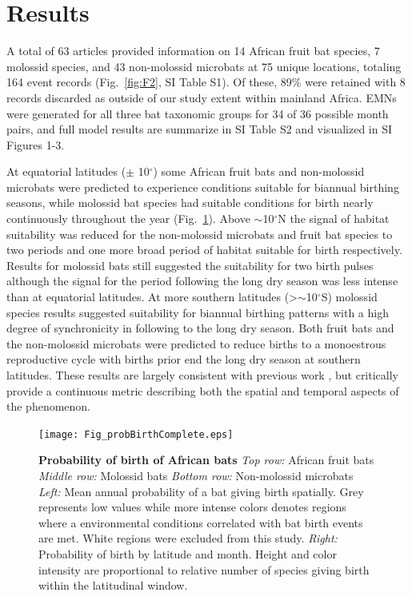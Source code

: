 \documentclass[a4paper,twoside, onecolumn]{article}
\begin{document}
	\section*{Results}
	A total of 63 articles provided information on 14 African fruit bat species, 7 molossid species, and 43 non-molossid microbats at 75 unique locations, totaling 164 event records (Fig.~\ref{fig:F2}, SI Table S1). Of these, 89\% were retained with 8 records discarded as outside of our study extent within mainland Africa. EMNs were generated for all three bat taxonomic groups for 34 of 36 possible month pairs, and full model results are summarize in SI Table S2 and visualized in SI Figures 1-3. \par
	At equatorial latitudes ($\pm$ 10$^{\circ}$) some African fruit bats and non-molossid microbats were predicted to experience conditions suitable for biannual birthing seasons, while molossid bat species had suitable conditions for birth nearly continuously throughout the year (Fig.~\ref{fig:F_prob_birth}). Above $\sim$10$^{\circ}$N the signal of habitat suitability was reduced for the non-molossid microbats and fruit bat species to two periods and one more broad period of habitat suitable for birth respectively. Results for molossid bats still suggested the suitability for two birth pulses although the signal for the period following the long dry season was less intense than at equatorial latitudes.  At more southern latitudes (\textgreater $\sim$10$^{\circ}$S) molossid species results suggested suitability for biannual birthing patterns with a high degree of synchronicity in following to the long dry season. Both fruit bats and the non-molossid microbats were predicted to reduce births to a monoestrous reproductive cycle with births prior end the long dry season at southern latitudes. These results are largely consistent with previous work \cite{Bernard1997, Happold1990, Monadjem2010, Happold2013}, but critically provide a continuous metric describing both the spatial and temporal aspects of the phenomenon. \par
	\begin{figure}[htbp]
		\centering
		\texttt{[image: Fig\_probBirthComplete.eps]}
		\caption{\textbf{Probability of birth of African bats }\textit{Top row:} African fruit bats \textit{Middle row:} Molossid bats \textit{Bottom row:} Non-molossid microbats \textit{Left:} Mean annual probability of a bat giving birth spatially. Grey represents low values while more intense colors denotes regions where a environmental conditions correlated with bat birth events are met. White regions were excluded from this study. \textit{Right:} Probability of birth by latitude and month. Height and color intensity are proportional to relative number of species giving birth within the latitudinal window.}
		\label{fig:F_prob_birth}
	\end{figure}
\end{document}
